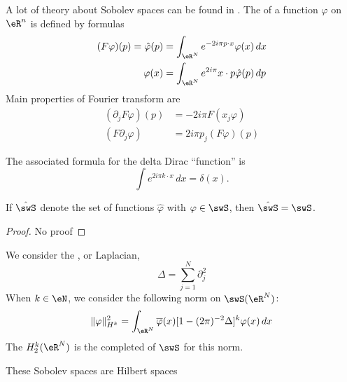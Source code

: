A lot of theory about Sobolev spaces can be found in \cite{Maslov,Taylor_PDO}. The  of a function $\varphi$ on $\eR^n$ is defined by formulas
\begin{subequations}
	\begin{align}
		(F\varphi)(p)=\hat\varphi(p) & =\int_{\eR^N} e^{-2i\pi p\cdot x}\varphi(x)\,dx     \\
		\varphi(x)                   & =\int_{\eR^{N}} e^{2i\pi}x\cdot p\hat\varphi(p)\,dp
	\end{align}
\end{subequations}
Main properties of Fourier transform are
\begin{subequations} \label{subeq_prop_Four}
	\begin{align}
		(\partial_jF\varphi)(p) & =-2i\pi F(x_j\varphi)   \\
		(F\partial_j\varphi)    & =2i\pi p_j(F\varphi)(p)
	\end{align}
\end{subequations}

The associated formula for the delta Dirac ``function'' is
\begin{equation}
	\int e^{2i\pi k\cdot x}\,dx=\delta(x).
\end{equation}

\begin{proposition}
	If $\hat\swS$ denote the set of functions $\hat\varphi$ with $\varphi\in\swS$, then $\hat\swS=\swS$.
\end{proposition}

\begin{proof}
	No proof
\end{proof}

We consider the , or Laplacian,
\begin{equation}
	\Delta=\sum_{j=1}^{N}\partial_j^2
\end{equation}
When $k\in\eN$, we consider the following norm on $\swS(\eR^N)$:
\begin{equation} \label{eq_def_norm_Sob}
	\| \varphi \|_{H^k}^2=\int_{\eR^N}\overline{\varphi}(x)[1-(2\pi)^{-2}\Delta]^k\varphi(x)\,dx
\end{equation}
The  $H^k_2(\eR^N)$ is the completed of $\swS$ for this norm.

\begin{proposition}
	These Sobolev spaces are Hilbert spaces
\end{proposition}

